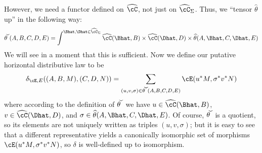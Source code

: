 \documentclass{amsart}
\newcommand{\C}{\cC}
\renewcommand{\Chat}{\ensuremath{\widehat{\C}}\xspace}
\newcommand{\Chats}{\ensuremath{\Chat_{\Sigma}}\xspace}
\newcommand{\thhat}{\ensuremath{\widehat{\theta}}\xspace}
\newcommand{\thchk}{\ensuremath{\widecheck{\theta}}\xspace}
\newcommand{\E}{\cE}
\begin{document}
However, we need a functor defined on \Chat, not just on \Chats.
Thus, we ``tensor $\thhat$ up'' in the following way:
\[ \thchk(A,B,C,D,E) = \int^{\Bhat,\Dhat\in\Chats} \Chat(\Bhat,B) \times \Chat(\Dhat,D)\times \thhat(A,\Bhat,C,\Dhat,E) \]
We will see in a moment that this is sufficient.
Now we define our putative horizontal distributive law to be
\begin{equation}\label{eq:delta}
  \delta_{\E,E}((A,B,M),(C,D,N)) = \sum_{(u,v,\sigma)\in \thchk(A,B,C,D,E)} \E(u^*M,\sigma^*v^*N)
\end{equation}
where according to the definition of $\thchk$ we have $u\in \Chat(\Bhat,B)$, $v\in \Chat(\Dhat,D)$, and $\sigma\in\thhat(A,\Bhat,C,\Dhat,E)$.
Of course, \thchk is a quotient, so its elements are not uniquely written as triples $(u,v,\sigma)$; but it is easy to see that a different representative yields a canonically isomorphic set of morphisms $\E(u^*M,\sigma^*v^*N)$, so $\delta$ is well-defined up to isomorphism.
\end{document}

